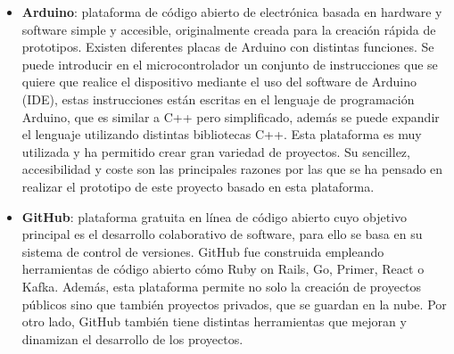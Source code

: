 \begin{itemize}
\item \textbf{Arduino}\cite{Arduino1}: plataforma de código abierto de electrónica basada en hardware y software simple y accesible, originalmente creada para la creación rápida de prototipos. Existen diferentes placas de Arduino con distintas funciones. Se puede introducir en el microcontrolador un conjunto de instrucciones que se quiere que realice el dispositivo mediante el uso del software de Arduino (IDE), estas instrucciones están escritas en el lenguaje de programación Arduino, que es similar a C++ pero simplificado, además se puede expandir el lenguaje utilizando distintas bibliotecas C++. Esta plataforma es muy utilizada y ha permitido crear gran variedad de proyectos. Su sencillez, accesibilidad y coste son las principales razones por las que se ha pensado en realizar el prototipo de este proyecto basado en esta plataforma. 

\item \textbf{GitHub}\cite{GitHub}: plataforma gratuita en línea de código abierto cuyo objetivo principal es el desarrollo colaborativo de software, para ello se basa en su sistema de control de versiones. GitHub fue construida empleando herramientas de código abierto cómo  Ruby on Rails, Go, Primer, React o Kafka. Además, esta plataforma permite no solo la creación de proyectos públicos sino que también proyectos privados, que se guardan en la nube. Por otro lado, GitHub también tiene distintas herramientas que mejoran y dinamizan el desarrollo de los proyectos.


\end{itemize}

